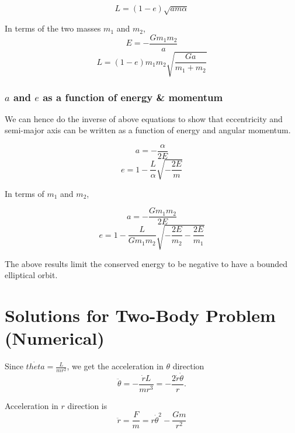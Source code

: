\documentclass{article}
\begin{document}
\begin{equation}
    L = (1-e) \sqrt{am\alpha}
\end{equation}

In terms of the two masses $m_1$ and $m_2$,
\begin{equation}
    E = -\frac{Gm_1 m_2}{a}
\end{equation}
\begin{equation}
    L = (1-e) m_1 m_2 \sqrt{\frac{Ga}{m_1+m_2}}
\end{equation}

\subsubsection{$a$ and $e$ as a function of energy \& momentum}
We can hence do the inverse of above equations to show that eccentricity and semi-major axis can be written as a function of energy and angular momentum.

\begin{equation}
    a = - \frac{\alpha}{2E}
\end{equation}
\begin{equation}
    e = 1- \frac{L}{\alpha}\sqrt{-\frac{2E}{m}}
\end{equation}

In terms of $m_1$ and $m_2$,

\begin{equation}
    a = - \frac{Gm_1 m_2}{2E}
\end{equation}
\begin{equation}
    e = 1- \frac{L}{Gm_1 m_2} \sqrt{- \frac{2E}{m_2} - \frac{2E}{m_1}}
\end{equation}

The above results limit the conserved energy to be negative to have a bounded elliptical orbit.


\section{Solutions for Two-Body Problem (Numerical)}

Since $\dot{theta} = \frac{L}{mr^2}$, we get the acceleration in $\theta$ direction
\begin{equation}
    \ddot{\theta} = - \frac{\dot{r} L}{mr^3} = -\frac{2\dot{r}\dot{\theta}}{r}.
\end{equation}

Acceleration in $r$ direction is
\begin{equation}
    \ddot{r} = \frac{F}{m} = r \dot{\theta}^2 - \frac{Gm}{r^2}
\end{equation}
\end{document}
